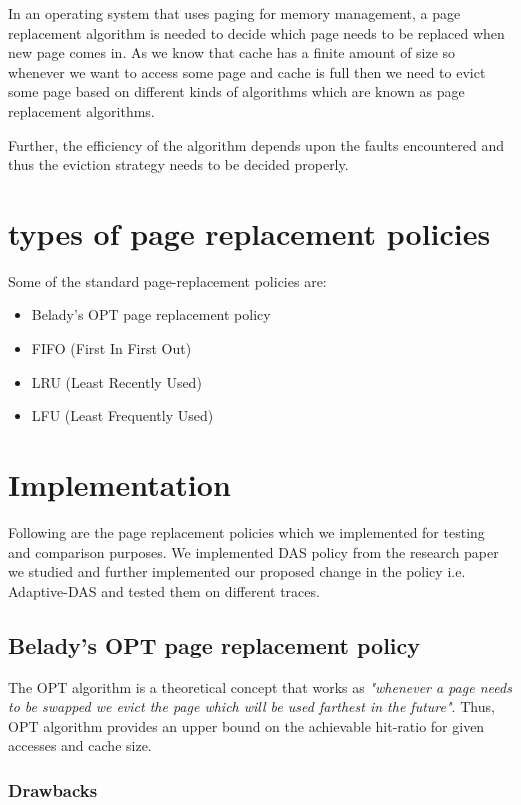 \documentclass[conference]{IEEEtran}
\begin{document}
In an operating system that uses paging for memory management, a page 
replacement algorithm is needed to decide which page needs to be replaced when 
new page comes in. As we know that cache has a finite amount of size so whenever we want to access some page and cache is full then we need to evict some page based on different kinds of algorithms which are known as page replacement algorithms.

Further, the efficiency of the algorithm depends upon the faults encountered and thus the eviction strategy needs to be decided properly.


\section{\textbf{types of page replacement policies}}

Some of the standard page-replacement policies are:
\begin{itemize}
    \item Belady's OPT page replacement policy
    \item FIFO (First In First Out)
    \item LRU (Least Recently Used)
    \item LFU (Least Frequently Used)
\end{itemize}

\section{\textbf{Implementation}}
Following are the page replacement policies which we implemented for testing and comparison purposes. We implemented DAS policy from the research paper we studied and further implemented our proposed change in the policy i.e. Adaptive-DAS and tested them on different traces.

\subsection{\textbf{Belady's OPT page replacement policy}}

The OPT algorithm is a theoretical concept that works as \textit{ "whenever a page needs to be swapped we evict the page which will be used farthest in the future"}. Thus, OPT algorithm provides an upper bound on the achievable hit-ratio for given accesses and cache size.
\\
\subsubsection*{Drawbacks}
\end{document}
